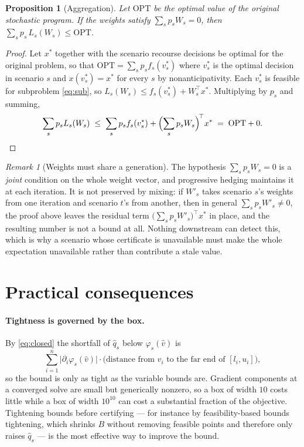 \documentclass[11pt]{article}
\theoremstyle{plain}
\newtheorem{proposition}[lemma]{Proposition}
\theoremstyle{remark}
\newtheorem{remark}[lemma]{Remark}
\newcommand{\W}{W}
\newcommand{\vhat}{\hat{v}}
\newcommand{\qhat}{\hat{q}}
\newcommand{\OPT}{\mathrm{OPT}}
\begin{document}
\begin{proposition}[Aggregation]\label{prop:agg}
Let $\OPT$ be the optimal value of the original stochastic program.  If the
weights satisfy $\sum_s p_s \W_s = 0$, then
$\sum_s p_s\, L_s(\W_s) \le \OPT$.
\end{proposition}

\begin{proof}
Let $x^{*}$ together with the scenario recourse decisions be optimal for the
original problem, so that $\OPT = \sum_s p_s f_s(v_s^{*})$ where $v_s^{*}$ is the
optimal decision in scenario $s$ and $x(v_s^{*}) = x^{*}$ for every $s$ by
nonanticipativity.  Each $v_s^{*}$ is feasible for subproblem \eqref{eq:sub}, so
$L_s(\W_s) \le f_s(v_s^{*}) + \W_s^{\top} x^{*}$.  Multiplying by $p_s$ and
summing,
\[
  \sum_s p_s L_s(\W_s)
  \;\le\; \sum_s p_s f_s(v_s^{*}) + \Bigl( \sum_s p_s \W_s \Bigr)^{\!\top} x^{*}
  \;=\; \OPT + 0 . \qedhere
\]
\end{proof}

\begin{remark}[Weights must share a generation]\label{rem:mixed}
The hypothesis $\sum_s p_s \W_s = 0$ is a \emph{joint} condition on the whole
weight vector, and progressive hedging maintains it at each iteration.  It is
not preserved by mixing: if $\W'_s$ takes scenario $s$'s weights from one
iteration and scenario $t$'s from another, then in general
$\sum_s p_s \W'_s \ne 0$, the proof above leaves the residual term
$\bigl(\sum_s p_s \W'_s\bigr)^{\top} x^{*}$ in place, and the resulting number
is not a bound at all.  Nothing downstream can detect this, which is why a
scenario whose certificate is unavailable must make the whole expectation
unavailable rather than contribute a stale value.
\end{remark}

\section{Practical consequences}\label{sec:practical}

\paragraph{Tightness is governed by the box.}
By \eqref{eq:closed} the shortfall of $\qhat_s$ below $\varphi_s(\vhat)$ is
\[
  \sum_{i=1}^{n} \bigl| \partial_i \varphi_s(\vhat) \bigr| \cdot
  \bigl( \text{distance from } \vhat_i \text{ to the far end of } [l_i,u_i] \bigr),
\]
so the bound is only as tight as the variable bounds are.  Gradient components
at a converged solve are small but generically nonzero, so a box of width $10$
costs little while a box of width $10^{10}$ can cost a substantial fraction of
the objective.  Tightening bounds before certifying --- for instance by
feasibility-based bounds tightening, which shrinks $B$ without removing feasible
points and therefore only raises $\qhat_s$ --- is the most effective way to
improve the bound.
\end{document}
